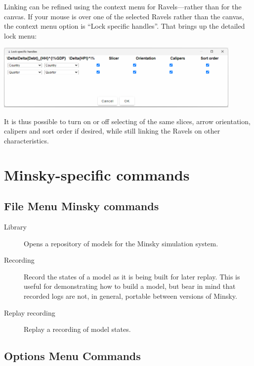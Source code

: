 Linking can be refined using the context menu for Ravels---rather
than for the canvas. If your mouse is over one of the selected Ravels
rather than the canvas, the context menu option is ``Lock specific
handles''. That brings up the detailed lock menu:

\includegraphics[width=12cm]{images/RavelLockSpecificHandles}

It is thus possible to turn on or off selecting of the same slices,
arrow orientation, calipers and sort order if desired, while still
linking the Ravels on other characteristics.

\section{Minsky-specific commands}

\subsection{File Menu Minsky commands}
\begin{description}
\item [{Library}] Opens a repository of models for the Minsky simulation
system.
\item [{Recording}] Record the states of a model as it is being built for
later replay. This is useful for demonstrating how to build a model,
but bear in mind that recorded logs are not, in general, portable
between versions of Minsky.
\item [{Replay recording}] Replay a recording of model states.
\end{description}

\subsection{Options Menu Commands}

